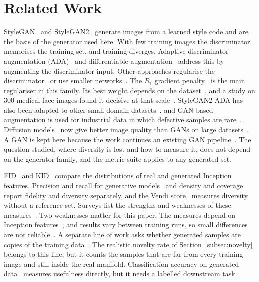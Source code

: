\documentclass[electronics,article,submit,pdftex,moreauthors]{Definitions/mdpi}
\begin{document}
\section{Related Work}
\label{sec:related}

StyleGAN~\cite{karras2019stylegan} and StyleGAN2~\cite{karras2020stylegan2}
generate images from a learned style code and are the basis of the generator
used here. With few training images the discriminator memorises the training
set, and training diverges. Adaptive discriminator augmentation
(ADA)~\cite{karras2020ada} and differentiable
augmentation~\cite{zhao2020diffaugment} address this by augmenting the
discriminator input. Other approaches regularise the
discriminator~\cite{tseng2021regularizing} or use smaller
networks~\cite{liu2021fastgan}. The $R_1$ gradient
penalty~\cite{mescheder2018converge} is the main regulariser in this family.
Its best weight depends on the dataset~\cite{karras2020ada}, and a study on
300 medical face images found it decisive at that
scale~\cite{mohanty2024rosacea}. StyleGAN2-ADA has also been adapted to other
small domain datasets~\cite{yao2025ruralroad}, and GAN-based augmentation is
used for industrial data in which defective samples are
rare~\cite{yang2023precacyclegan}. Diffusion
models~\cite{ho2020ddpm,rombach2022ldm} now give better image quality than
GANs on large datasets~\cite{dhariwal2021diffusionbeatgans}. A GAN is kept
here because the work continues an existing GAN
pipeline~\cite{shubitidze2026masks}. The question studied, where diversity is
lost and how to measure it, does not depend on the generator family, and the
metric suite applies to any generated set.

FID~\cite{heusel2017fid} and KID~\cite{binkowski2018kid} compare the
distributions of real and generated Inception features. Precision and recall
for generative
models~\cite{sajjadi2018precisionrecall,kynkaanniemi2019precision} and density
and coverage~\cite{naeem2020prdc} report fidelity and diversity separately,
and the Vendi score~\cite{friedman2023vendi} measures diversity without a
reference set. Surveys list the strengths and weaknesses of these
measures~\cite{borji2022proscons,valdebenito2023metrics}. Two weaknesses
matter for this paper. The measures depend on Inception
features~\cite{jayasumana2024rethinkingfid,stein2023exposingflaws}, and
results vary between training runs, so small differences are not
reliable~\cite{lucic2018equal}. A separate line of work asks whether
generated samples are copies of the training
data~\cite{meehan2020threesample,alaa2022faithful}. The realistic novelty
rate of Section~\ref{subsec:novelty} belongs to this line, but it counts the
samples that are far from every training image and still inside the real
manifold. Classification accuracy on generated
data~\cite{ravuri2019cas} measures usefulness directly, but it needs a
labelled downstream task.
\end{document}
